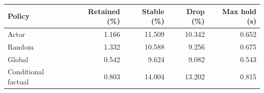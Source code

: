 \begin{tabular}{lrrrr}
\toprule
Policy & Retained (\%) & Stable (\%) & Drop (\%) & Max hold (s)\\
\midrule
Actor & 1.166 & 11.509 & 10.342 & 0.652\\
Random & 1.332 & 10.588 & 9.256 & 0.675\\
Global & 0.542 & 9.624 & 9.082 & 0.543\\
Conditional factual & 0.803 & 14.004 & 13.202 & 0.815\\
\bottomrule
\end{tabular}
